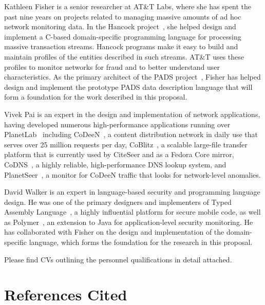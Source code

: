 \documentclass[12pt]{article}
\begin{document}
Kathleen Fisher is a senior researcher at AT\&T Labs,
where she has spent the past nine years on projects
related to managing massive amounts of ad hoc network monitoring data.
In the Hancock project~\cite{kdd00,hancock-toplas}, she helped 
design and implement a C-based
domain-specific programming language for processing massive  
transaction streams.  Hancock programs make it easy to build
and maintain profiles of the entities described in such streams. 
AT\&T uses these profiles to monitor networks for fraud 
and to better understand user characteristics.
As the primary architect of the PADS project~\cite{fisher+:pads}, 
Fisher has helped design and implement the prototype PADS
data description language that will form a foundation for the work
described in this proposal.  

Vivek Pai is an expert in the
design and implementation of network applications, having developed
numerous high-performance applications running over
PlanetLab~\cite{planetlab} including CoDeeN~\cite{codeen}, a content
distribution network in daily use that serves over 25 million
requests per day, CoBlitz~\cite{coblitz}, a scalable large-file
transfer platform that is currently used by CiteSeer and as
a Fedora Core mirror, CoDNS~\cite{codns}, a highly reliable,
high-performance DNS lookup system, and PlanetSeer~\cite{planetseer},
a monitor for CoDeeN traffic that looks for network-level anomalies.

David Walker is an expert in language-based security and programming
language design.  He was one of the primary designers and implementers
of Typed Assembly Language~\cite{morrisett+:tal,morrisett+:journal-stal}, 
a highly influential platform
for secure mobile code, as well as Polymer~\cite{bauer+:polymer,ligatti+:renewal,ligatti+:edit-automata}, an
extension to Java for application-level security monitoring.  He has
collaborated with Fisher on the design and implementation of the
\pads{} domain-specific language, which forms the foundation for
the research in this proposal.

Please find CVs outlining the personnel qualifications in detail attached.


\newpage
\section{References Cited}

{

}
\end{document}
